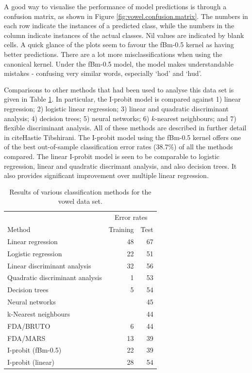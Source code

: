 \documentclass[a4paper,showframe,11pt]{report}\usepackage[]{graphicx}\usepackage[]{color}
\newenvironment{knitrout}{}{} %
\begin{document}
A good way to visualise the performance of model predictions is through a confusion matrix, as shown in Figure \ref{fig:vowel.confusion.matrix}. The numbers in each row indicate the instances of a predicted class, while the numbers in the column indicate instances of the actual classes. Nil values are indicated by blank cells. A quick glance of the plots seem to favour the fBm-0.5 kernel as having better predictions. There are a lot more misclassifications when using the canonical kernel. Under the fBm-0.5 model, the model makes understandable mistakes - confusing very similar words, especially `hod' and `hud'.

Comparisons to other methods that had been used to analyse this data set is given in Table \ref{tab:vowel.tab}.
In particular, the I-probit model is compared against 1) linear regression; 2) logistic linear regression; 3) linear and quadratic discriminant analysis; 4) decision trees; 5) neural networks; 6) $k$-nearest neighbours; and 7) flexible discriminant analysis.
All of these methods are described in further detail in cite{Hastie Tibshirani}.
The I-probit model using the fBm-0.5 kernel offers one of the best out-of-sample classification error rates (38.7\%) of all the methods compared.
The linear I-probit model is seen to be comparable to logistic regression, linear and quadratic discrimant analysis, and also decision trees.
It also provides significant improvement over multiple linear regression.

\begin{knitrout}
\color{fgcolor}\begin{table}

\caption{\label{tab:vowel.tab}Results of various classification methods for the vowel data set.}
\centering
\begin{tabular}[t]{lrr}
\toprule
\multicolumn{1}{c}{ } & \multicolumn{2}{c}{Error rates} \\
\cmidrule(l{2pt}r{2pt}){2-3}
Method & Training & Test\\
\midrule
Linear regression & 48 & 67\\
Logistic regression & 22 & 51\\
Linear discriminant analysis & 32 & 56\\
Quadratic discriminant analysis & 1 & 53\\
\addlinespace
Decision trees & 5 & 54\\
Neural networks &  & 45\\
k-Nearest neighbours &  & 44\\
FDA/BRUTO & 6 & 44\\
FDA/MARS & 13 & 39\\
\addlinespace
I-probit (fBm-0.5) & 22 & 39\\
I-probit (linear) & 28 & 54\\
\bottomrule
\end{tabular}
\end{table}


\end{knitrout}
\end{document}
